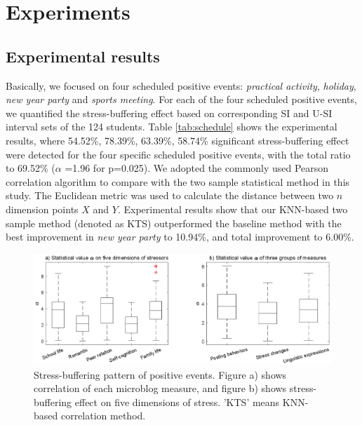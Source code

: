 


\section{Experiments}
\subsection{Experimental results}
\label{subsec:experiment}
Basically, we focused on four scheduled positive events:
\emph{practical activity}, \emph{holiday}, \emph{new year party} and \emph{sports meeting}.
For each of the four scheduled positive events,
we quantified the stress-buffering effect based on corresponding SI and U-SI interval sets of the 124 students.
Table \ref{tab:schedule} shows the experimental results,
where 54.52\%, 78.39\%, 63.39\%, 58.74\% significant stress-buffering effect were detected for the four specific scheduled positive events,
with the total ratio to 69.52\% ($\alpha$ =1.96 for p=0.025).
We adopted the commonly used Pearson correlation algorithm to compare with the two sample statistical method in this study.
The Euclidean metric was used to calculate the distance between two $n$ dimension points $X$ and $Y$.
Experimental results show that our KNN-based two sample method (denoted as KTS) outperformed the baseline method
with the best improvement in \emph{new year party} to 10.94\%,
and total improvement to 6.00\%.

\begin{figure}
\centering
\includegraphics[width=\linewidth]{figs/cor.eps}%
\caption{\small{Stress-buffering pattern of positive events. Figure a) shows correlation of each microblog measure,
and figure b) shows stress-buffering effect on five dimensions of stress. 'KTS' means KNN-based correlation method.}}
\label{fig:correlation}
\end{figure}

